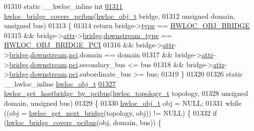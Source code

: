 \begin{DoxyCode}
{{01310 \textcolor{keyword}{static} \_\_hwloc\_inline \textcolor{keywordtype}{int}
\hypertarget{a00031_source_l01311}{}\hyperlink{a00064_gaef22d6bf5cb0b7f13a863780126a8cb7}{01311} \hyperlink{a00064_gaef22d6bf5cb0b7f13a863780126a8cb7}{hwloc_bridge_covers_pcibus}(\hyperlink{a00016}{hwloc_obj_t} bridge,
01312                            \textcolor{keywordtype}{unsigned} domain, \textcolor{keywordtype}{unsigned} bus)
01313 \{
01314   \textcolor{keywordflow}{return} bridge->\hyperlink{a00016_acc4f0803f244867e68fe0036800be5de}{type} == \hyperlink{a00041_ggacd37bb612667dc437d66bfb175a8dc55a6825f10895fea60aca7a6ba9fe273db0}{HWLOC_OBJ_BRIDGE}
01315     && bridge->\hyperlink{a00016_accd40e29f71f19e88db62ea3df02adc8}{attr}->\hyperlink{a00017_adbdf280699dd84c7619cd8d9edc0d958}{bridge}.\hyperlink{a00012_ac6a169b672d0e9f75756fd5665828b93}{downstream_type} == \hyperlink{a00041_gga48a4803c72574191d7ead1c62aaf9860a8f3b4cecf3dab6073d74696d10863c60}{HWLOC_OBJ_BRIDGE_PCI}
01316     && bridge->\hyperlink{a00016_accd40e29f71f19e88db62ea3df02adc8}{attr}->\hyperlink{a00017_adbdf280699dd84c7619cd8d9edc0d958}{bridge}.\hyperlink{a00012_acaf1ae02e37182bbb6966f8c4f35e499}{downstream}.\hyperlink{a00012_ab5c564e7c95b747dae9eb84ec0a2c31e}{pci}.domain == domain
01317     && bridge->\hyperlink{a00016_accd40e29f71f19e88db62ea3df02adc8}{attr}->\hyperlink{a00017_adbdf280699dd84c7619cd8d9edc0d958}{bridge}.\hyperlink{a00012_acaf1ae02e37182bbb6966f8c4f35e499}{downstream}.\hyperlink{a00012_ab5c564e7c95b747dae9eb84ec0a2c31e}{pci}.secondary\_bus <= bus
01318     && bridge->\hyperlink{a00016_accd40e29f71f19e88db62ea3df02adc8}{attr}->\hyperlink{a00017_adbdf280699dd84c7619cd8d9edc0d958}{bridge}.\hyperlink{a00012_acaf1ae02e37182bbb6966f8c4f35e499}{downstream}.\hyperlink{a00012_ab5c564e7c95b747dae9eb84ec0a2c31e}{pci}.subordinate\_bus >= bus;
01319 \}
01320 
01326 \textcolor{keyword}{static} \_\_hwloc\_inline \hyperlink{a00016}{hwloc_obj_t}
\hypertarget{a00031_source_l01327}{}\hyperlink{a00064_ga81d4f68afbd68d94eb70d4f5c603eff5}{01327} \hyperlink{a00064_ga81d4f68afbd68d94eb70d4f5c603eff5}{hwloc_get_hostbridge_by_pcibus}(\hyperlink{a00039_ga9d1e76ee15a7dee158b786c30b6a6e38}{hwloc_topology_t} topology,
01328                                \textcolor{keywordtype}{unsigned} domain, \textcolor{keywordtype}{unsigned} bus)
01329 \{
01330   \hyperlink{a00016}{hwloc_obj_t} obj = NULL;
01331   \textcolor{keywordflow}{while} ((obj = \hyperlink{a00064_ga2bd3f856d0fc3c6c02642c17d763b823}{hwloc_get_next_bridge}(topology, obj)) != NULL) \{
01332     \textcolor{keywordflow}{if} (\hyperlink{a00064_gaef22d6bf5cb0b7f13a863780126a8cb7}{hwloc_bridge_covers_pcibus}(obj, domain, bus)) \{
}}
\end{DoxyCode}
